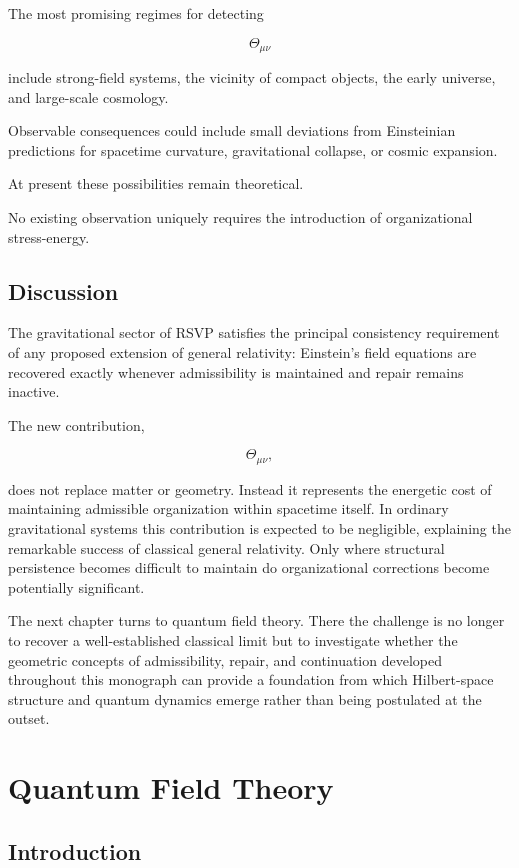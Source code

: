 \documentclass[11pt,oneside]{book}
\numberwithin{equation}{chapter}
\theoremstyle{definition}
\theoremstyle{plain}
\begin{document}
The most promising regimes for detecting

\[
\Theta_{\mu\nu}
\]

include strong-field systems, the vicinity of compact objects, the early
universe, and large-scale cosmology.

Observable consequences could include small deviations from Einsteinian
predictions for spacetime curvature, gravitational collapse, or cosmic
expansion.

At present these possibilities remain theoretical.

No existing observation uniquely requires the introduction of organizational
stress-energy.

\section{Discussion}

The gravitational sector of RSVP satisfies the principal consistency
requirement of any proposed extension of general relativity: Einstein's
field equations are recovered exactly whenever admissibility is maintained
and repair remains inactive.

The new contribution,

\[
\Theta_{\mu\nu},
\]

does not replace matter or geometry. Instead it represents the energetic
cost of maintaining admissible organization within spacetime itself. In
ordinary gravitational systems this contribution is expected to be
negligible, explaining the remarkable success of classical general
relativity. Only where structural persistence becomes difficult to maintain
do organizational corrections become potentially significant.

The next chapter turns to quantum field theory. There the challenge is no
longer to recover a well-established classical limit but to investigate
whether the geometric concepts of admissibility, repair, and continuation
developed throughout this monograph can provide a foundation from which
Hilbert-space structure and quantum dynamics emerge rather than being
postulated at the outset.

\chapter{Quantum Field Theory}

\section{Introduction}
\end{document}

